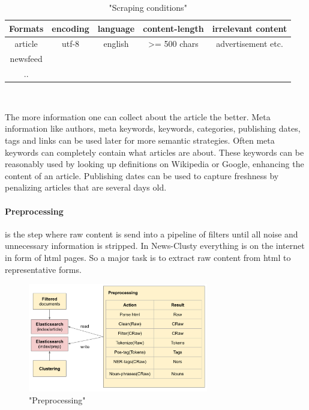     \begin{table}[h!]
      \centering
      \begin{tabular}{c|c|c|c|c}
        Formats   &   encoding &   language &  content-length & irrelevant content  \\
        \hline
        article   &    utf-8   &    english &   >= 500 chars  &   advertisement etc. \\
        newsfeed  &&&&\\
        ..        &&&&\\
      \end{tabular}\\
      \caption{"Scraping conditions"}
    \end{table}

  The more information one can collect about the article the better. Meta information like authors, meta keywords, keywords, categories, publishing dates, tags and links can be used later for more semantic strategies. Often meta keywords can completely contain what articles are about. These keywords can be reasonably used by looking up definitions on Wikipedia or Google, enhancing the content of an article. Publishing dates can be used to capture freshness by penalizing articles that are several days old. 

  \paragraph{Preprocessing} is the step where raw content is send into a pipeline of filters until all noise and unnecessary information is stripped. In News-Clusty everything is on the internet in form of html pages. So a major task is to extract raw content from html to representative forms.

    \begin{figure}[h!]
      \centering
        \includegraphics[width=0.7\textwidth]{preprocessing.png}
        \caption{"Preprocessing"}
        \label{preprocessing}
    \end{figure} 

